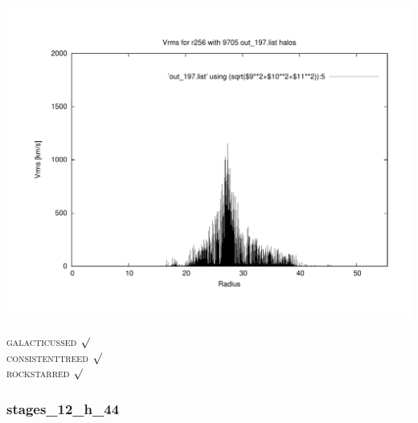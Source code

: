 \includegraphics[scale=0.3]{r256/h70/mm_h/plot_Vrms_out_197.pdf}





\textsc{galacticussed} $\surd$ \\
\textsc{consistenttreed} $\surd$ \\
\textsc{rockstarred} $\surd$ \\

% 
%
%
%
%
%
%
%

\newpage

\subsubsection{stages\_12\_h\_44}

